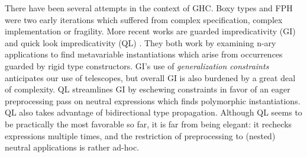 \documentclass[acmsmall,review,anonymous,prologue,dvipsnames]{acmart}\settopmatter{printfolios=true,printccs=false,printacmref=false}
\theoremstyle{remark}
\begin{document}
There have been several attempts in the context of GHC. Boxy types
\cite{vytiniotis2006boxy} and FPH \cite{vytiniotis2008fph} were two early
iterations which suffered from complex specification, complex implementation or
fragility. More recent works are guarded impredicativity (GI)
\cite{serrano2018guarded} and quick look impredicativity (QL)
\cite{serrano2020a}. They both work by examining n-ary applications to find
metavariable instantiations which arise from occurrences guarded by rigid type
constructors. GI's use of \emph{generalization constraints} anticipates our use
of telescopes, but overall GI is also burdened by a great deal of complexity. QL
streamlines GI by eschewing constraints in favor of an eager preprocessing pass
on neutral expressions which finds polymorphic instantiations. QL also takes
advantage of bidirectional type propagation.  Although QL seems to be
practically the most favorable so far, it is far from being elegant: it rechecks
expressions multiple times, and the restriction of preprocessing to (nested)
neutral applications is rather ad-hoc.
\end{document}
